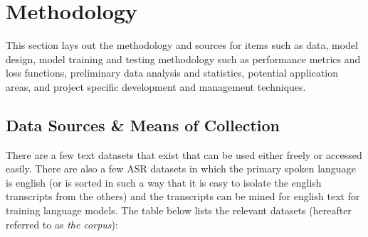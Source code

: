\documentclass[10pt]{article}
\begin{document}
    \section{Methodology}
        This section lays out the methodology and sources for items such as data, model design, model training and testing methodology
        such as performance metrics and loss functions, preliminary data analysis and statistics, potential application areas, and
        project specific development and management techniques.

        \subsection{Data Sources \& Means of Collection}
        There are a few text datasets that exist that can be used either freely or accessed easily. There are also a few ASR datasets
        in which the primary spoken language is english (or is sorted in such a way that it is easy to isolate the english transcripts
        from the others) and the transcripts can be mined for english text for training language models. The table below lists the
        relevant datasets (hereafter referred to as \textit{the corpus}):
\end{document}
